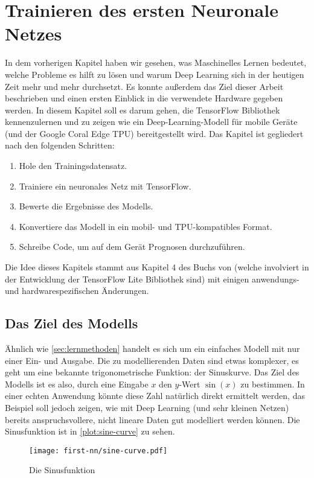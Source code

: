 \chapter{Trainieren des ersten Neuronale Netzes}
In dem vorherigen Kapitel haben wir gesehen,
was Maschinelles Lernen bedeutet, welche
Probleme es hilft zu lösen und warum
Deep Learning sich in der heutigen Zeit mehr und mehr durchsetzt.
Es konnte außerdem das Ziel dieser Arbeit
beschrieben und einen ersten Einblick
in die verwendete Hardware gegeben werden.
In diesem Kapitel soll es darum gehen, die
TensorFlow Bibliothek kennenzulernen
und zu zeigen wie ein Deep-Learning-Modell
für mobile Geräte (und der Google Coral Edge TPU) bereitgestellt wird.
Das Kapitel ist gegliedert nach den folgenden Schritten:
\begin{enumerate}
  \item Hole den Trainingsdatensatz.
  \item Trainiere ein neuronales Netz mit TensorFlow.
  \item Bewerte die Ergebnisse des Modells.
  \item Konvertiere das Modell in ein mobil- und TPU-kompatibles Format.
  \item Schreibe Code, um auf dem Gerät Prognosen durchzuführen.
\end{enumerate}
Die Idee dieses Kapitels stammt aus Kapitel 4 des Buchs 
von \textcite{book:tiny-ml} (welche involviert in der Entwicklung
der TensorFlow Lite Bibliothek sind) mit einigen
anwendungs- und hardwarespezifischen Änderungen.

\section{Das Ziel des Modells}
Ähnlich wie \autoref{sec:lernmethoden} handelt es sich
um ein einfaches Modell mit nur einer Ein- und Ausgabe.
Die zu modellierenden Daten sind etwas komplexer,
es geht um eine bekannte trigonometrische Funktion: der Sinuskurve.
Das Ziel des Modells ist es also, durch eine Eingabe $x$
den $y$-Wert $\sin(x)$ zu bestimmen.
In einer echten Anwendung könnte
diese Zahl natürlich direkt ermittelt werden,
das Beispiel soll jedoch zeigen,
wie mit Deep Learning (und sehr kleinen Netzen)
bereits anspruchsvollere, nicht lineare Daten gut modelliert werden können.
Die Sinusfunktion ist in \autoref{plot:sine-curve} zu sehen.
\begin{figure}[!h]
  \centering
  \texttt{[image: first-nn/sine-curve.pdf]}
  \caption{Die Sinusfunktion}
  \label{plot:sine-curve}
\end{figure}

